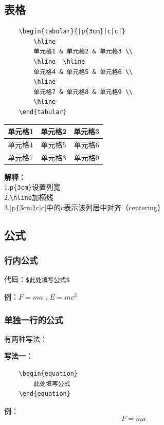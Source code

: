 \documentclass[UTF8,a4paper]{ctexart}
\begin{document}
\subsection{表格} 
\begin{lstlisting}
    \begin{tabular}{|p{3cm}|c|c|}
        \hline
        单元格1 & 单元格2 & 单元格3 \\
        \hline  \hline
        单元格4 & 单元格5 & 单元格6 \\
        \hline
        单元格7 & 单元格8 & 单元格9 \\
        \hline
    \end{tabular}
\end{lstlisting}
\begin{tabular}{|p{3cm}|c|c|}
    \hline
    单元格1 & 单元格2 & 单元格3 \\
    \hline  \hline
    单元格4 & 单元格5 & 单元格6 \\
    \hline
    单元格7 & 单元格8 & 单元格9 \\
    \hline
\end{tabular}\bigskip

\textbf{解释：}\\
1.\verb|p{3cm}|设置列宽\\
2.\verb|\hline|加横线\\
3.|p\verb|{|3cm\verb|}|c|c|中的c表示该列居中对齐（centering）



\subsection{公式}
\subsubsection{行内公式}
代码：\verb|$此处填写公式$|

例：$F=ma$ , $E=mc^2$
\subsubsection{单独一行的公式}
有两种写法：

\textbf{写法一：}
\begin{lstlisting}
    \begin{equation}
        此处填写公式
    \end{equation}
\end{lstlisting}
\qquad 例：
\begin{equation}
    F=ma
\end{equation}
\end{document}
